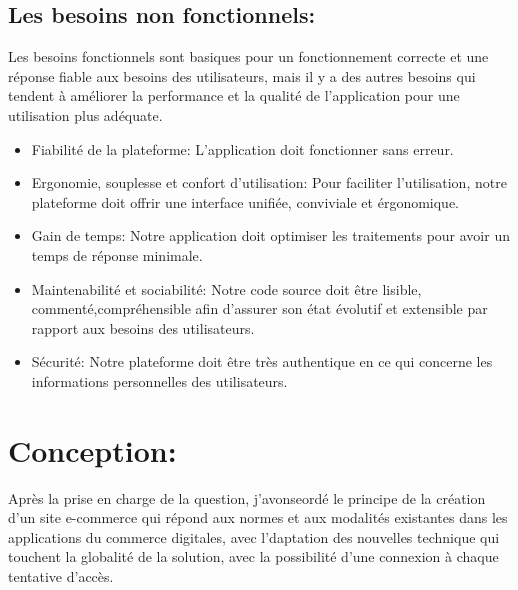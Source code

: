 \documentclass[a4paper]{report}
\begin{document}
\begin{doublespace}
    \subsection{Les besoins non fonctionnels:}
    Les besoins fonctionnels sont basiques pour un fonctionnement
    correcte et une réponse fiable aux besoins des utilisateurs, mais il y a des
    autres besoins qui tendent à améliorer la performance et la qualité de
    l'application pour une utilisation plus adéquate.
    \begin{itemize}
        \item Fiabilité de la plateforme: L’application doit
              fonctionner sans erreur.
        \item Ergonomie, souplesse et confort d’utilisation: Pour
              faciliter l’utilisation, notre plateforme doit offrir une interface unifiée,
              conviviale et érgonomique.
        \item Gain de temps: Notre application doit optimiser les
              traitements pour avoir un temps de réponse minimale.
        \item Maintenabilité et sociabilité: Notre code source doit
              être lisible, commenté,compréhensible afin d’assurer son état évolutif et
              extensible par rapport aux besoins des utilisateurs.
        \item Sécurité: Notre plateforme doit  être très
              authentique en ce qui concerne les informations personnelles des utilisateurs.
    \end{itemize}
    \section{Conception:}

    Après la prise en charge de la question, j'avonseordé le
    principe de la création d'un site e-commerce qui répond aux normes et aux
    modalités existantes dans les applications du commerce digitales, avec
    l'daptation des nouvelles technique qui touchent la globalité de la solution,
    avec la possibilité d'une connexion à chaque tentative d'accès.

\end{doublespace}
\end{document}

